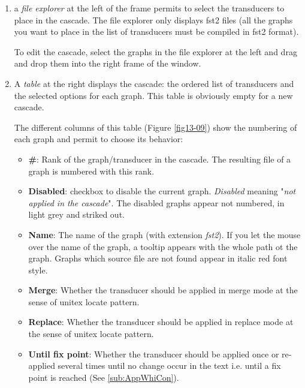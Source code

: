 \begin{enumerate}
	\item a \textit{file explorer} at the left of the frame permits to select the transducers to place in the cascade. 
	The file explorer only displays fst2 files (all the graphs you want to place in the list of transducers must be compiled in fst2 format). 
	
	To edit the cascade, select the graphs in the file explorer at the left and drag and drop them into the right frame of the window.
	\item A \textit{table} at the right displays the cascade: the ordered list of transducers and the selected options for each graph.
		This table is obviously empty for a new cascade. 
	 
	The different columns of this table (Figure \ref{fig13-09}) show the numbering of each graph and permit to choose its behavior:
	\begin{itemize}
		  \item \textbf{\#}: Rank of the graph/transducer in the cascade. The resulting file of a graph is numbered with this rank.
		  \item \textbf{Disabled}: checkbox to disable the current graph. \textit{Disabled} meaning "\textit{not applied in the cascade}". The disabled graphs appear not numbered, in light grey and striked out.
			\item \textbf{Name}: The name of the graph (with extension \emph{fst2}). If you let the mouse over the name of the graph, a tooltip appears with the whole path ot the graph. Graphs which source file are not found appear in italic red font style.
		  \item \textbf{Merge}: Whether the transducer should be applied in merge mode at the sense of unitex locate pattern.
			\item \textbf{Replace}: Whether the transducer should be applied in replace mode at the sense of unitex locate pattern.
		  \item \textbf{Until fix point}: Whether the transducer should be applied once or re-applied several times until no change occur in the text i.e. until a fix point is reached (See \ref{sub:AppWhiCon}).
	\end{itemize}


\end{enumerate}
